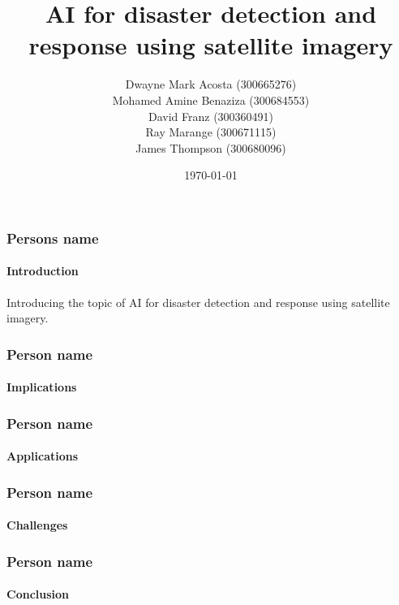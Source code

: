 \documentclass{beamer}
\title{AI for disaster detection and response using satellite imagery}
\author{Dwayne Mark Acosta (300665276) \\ Mohamed Amine Benaziza (300684553) \\ David Franz (300360491) \\ Ray Marange (300671115) \\ James Thompson (300680096)}
\date{\today}
\newcommand{\namedframe}[3]{
  \begin{frame}
    \frametitle{#1}
    \framesubtitle{#2}
    #3
  \end{frame}
}
\begin{document}
\frame{\titlepage}

\namedframe{Persons name}{Introduction}{
  Introducing the topic of AI for disaster detection and response using satellite imagery.
}

\namedframe{Person name}{Implications}{

}

\namedframe{Person name}{Applications}{

}

\namedframe{Person name}{Challenges}{

}

\namedframe{Person name}{Conclusion}{

}
\end{document}
